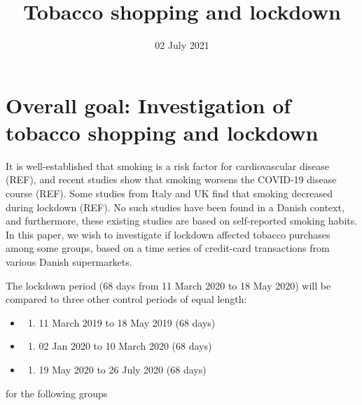 \documentclass[
  11pt,
]{article}
\title{Tobacco shopping and lockdown}
\author{}
\date{\vspace{-2.5em}\small 02 July 2021}
\providecommand{\tightlist}{%
  \setlength{\itemsep}{0pt}\setlength{\parskip}{0pt}}
\begin{document}
\maketitle

\hypertarget{overall-goal-investigation-of-tobacco-shopping-and-lockdown}{%
\section{Overall goal: Investigation of tobacco shopping and
lockdown}\label{overall-goal-investigation-of-tobacco-shopping-and-lockdown}}

It is well-established that smoking is a risk factor for cardiovascular
disease (REF), and recent studies show that smoking worsens the COVID-19
disease course (REF). Some studies from Italy and UK find that smoking
decreased during lockdown (REF). No such studies have been found in a
Danish context, and furthermore, these existing studies are based on
self-reported smoking habits. In this paper, we wish to investigate if
lockdown affected tobacco purchases among some groups, based on a time
series of credit-card transactions from various Danish supermarkets.

The lockdown period (68 days from 11 March 2020 to 18 May 2020) will be
compared to three other control periods of equal length:

\begin{itemize}
\item
  \begin{enumerate}
  \def\labelenumi{\alph{enumi})}
  \tightlist
  \item
    11 March 2019 to 18 May 2019 (68 days)
  \end{enumerate}
\item
  \begin{enumerate}
  \def\labelenumi{\alph{enumi})}
  \setcounter{enumi}{1}
  \tightlist
  \item
    02 Jan 2020 to 10 March 2020 (68 days)
  \end{enumerate}
\item
  \begin{enumerate}
  \def\labelenumi{\alph{enumi})}
  \setcounter{enumi}{2}
  \tightlist
  \item
    19 May 2020 to 26 July 2020 (68 days)
  \end{enumerate}
\end{itemize}

for the following groups
\end{document}
